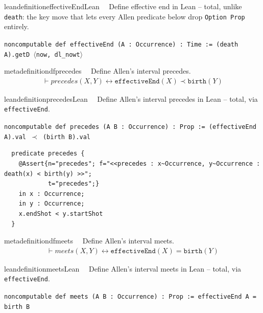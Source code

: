 \begin{restatable}{leandefinition}{effectiveEndLean}~~ Define effective end in Lean --
total, unlike \texttt{death}: the key move that lets every Allen predicate below drop \texttt{Option Prop}
entirely.

\texttt{\textcolor{leancolor}{noncomputable def} \textcolor{leanyellow}{effectiveEnd} (A : Occurrence) : Time := (death A).getD $\langle$now, dl\_nowt$\rangle$}
\label{effectiveEnd}
\end{restatable}

\begin{restatable}{metadefinition}{dfprecedes}~~ Define Allen's interval precedes.
\begin{align}
\vdash \textit{precedes}(X,Y) \leftrightarrow \texttt{effectiveEnd}(X) \prec \texttt{birth}(Y)
\label{eq:df-precedes}\tag{df-precedes}
\end{align}
\end{restatable}

\begin{restatable}{leandefinition}{precedesLean}~~ Define Allen's interval precedes in Lean
-- total, via \texttt{effectiveEnd}.

\texttt{\textcolor{leancolor}{noncomputable def} \textcolor{leanyellow}{precedes} (A B : Occurrence) : Prop := (effectiveEnd A).val $\prec$ (birth B).val}
\label{precedes}
\end{restatable}

\begin{lstlisting}
  predicate precedes {
    @Assert{n="precedes"; f="<<precedes : x~Occurrence, y~Occurrence : death(x) < birth(y) >>"; 
    		t="precedes";}
    in x : Occurrence;
    in y : Occurrence;
    x.endShot < y.startShot
  }
\end{lstlisting}
\begin{restatable}{metadefinition}{dfmeets}~~ Define Allen's interval meets.
\begin{align}
\vdash \textit{meets}(X,Y) \leftrightarrow \texttt{effectiveEnd}(X) = \texttt{birth}(Y)
\label{eq:df-meets}\tag{df-meets}
\end{align}
\end{restatable}

\begin{restatable}{leandefinition}{meetsLean}~~ Define Allen's interval meets in Lean --
total, via \texttt{effectiveEnd}.

\texttt{\textcolor{leancolor}{noncomputable def} \textcolor{leanyellow}{meets} (A B : Occurrence) : Prop := effectiveEnd A = birth B}
\label{meets}
\end{restatable}

